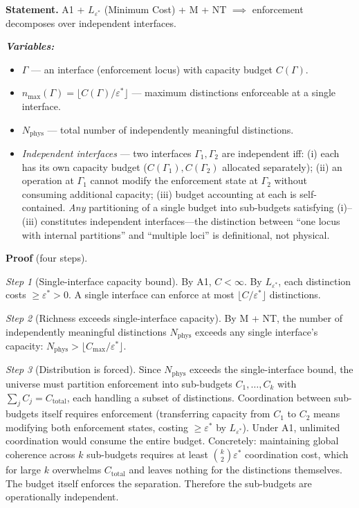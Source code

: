 \documentclass[11pt]{article}
\newenvironment{varlist}{\begin{itemize}[nosep,leftmargin=2em]}{\end{itemize}}
\begin{document}
\begin{tcolorbox}[apfbox, title={Lemma $L_{\mathrm{loc}}$ (Locality)}]
\textbf{Statement.}  A1 + $L_{\varepsilon^*}$ (Minimum Cost) + M + NT $\implies$ enforcement decomposes over independent interfaces.

\smallskip\noindent\textbf{\textit{Variables:}}
\begin{varlist}
\item $\Gamma$ --- an interface (enforcement locus) with capacity budget $C(\Gamma)$.
\item $n_{\max}(\Gamma) = \lfloor C(\Gamma) / \varepsilon^* \rfloor$ --- maximum distinctions enforceable at a single interface.
\item $N_{\mathrm{phys}}$ --- total number of independently meaningful distinctions.
\item \textit{Independent interfaces} --- two interfaces $\Gamma_1, \Gamma_2$ are independent iff: (i) each has its own capacity budget ($C(\Gamma_1), C(\Gamma_2)$ allocated separately); (ii) an operation at $\Gamma_1$ cannot modify the enforcement state at $\Gamma_2$ without consuming additional capacity; (iii) budget accounting at each is self-contained.  \emph{Any} partitioning of a single budget into sub-budgets satisfying (i)--(iii) constitutes independent interfaces---the distinction between ``one locus with internal partitions'' and ``multiple loci'' is definitional, not physical.
\end{varlist}

\smallskip\noindent\textbf{Proof} (four steps).

\textit{Step 1} (Single-interface capacity bound).  By A1, $C < \infty$.  By $L_{\varepsilon^*}$, each distinction costs $\ge \varepsilon^* > 0$.  A single interface can enforce at most $\lfloor C / \varepsilon^* \rfloor$ distinctions.

\textit{Step 2} (Richness exceeds single-interface capacity).  By M + NT, the number of independently meaningful distinctions $N_{\mathrm{phys}}$ exceeds any single interface's capacity: $N_{\mathrm{phys}} > \lfloor C_{\max} / \varepsilon^* \rfloor$.

\textit{Step 3} (Distribution is forced).  Since $N_{\mathrm{phys}}$ exceeds the single-interface bound, the universe must partition enforcement into sub-budgets $C_1, \ldots, C_k$ with $\sum_j C_j = C_{\mathrm{total}}$, each handling a subset of distinctions.  Coordination between sub-budgets itself requires enforcement (transferring capacity from $C_1$ to $C_2$ means modifying both enforcement states, costing $\ge \varepsilon^*$ by $L_{\varepsilon^*}$).  Under A1, unlimited coordination would consume the entire budget.  Concretely: maintaining global coherence across $k$ sub-budgets requires at least $\binom{k}{2}\varepsilon^*$ coordination cost, which for large $k$ overwhelms $C_{\mathrm{total}}$ and leaves nothing for the distinctions themselves.  The budget itself enforces the separation.  Therefore the sub-budgets are operationally independent.


\end{tcolorbox}
\end{document}
